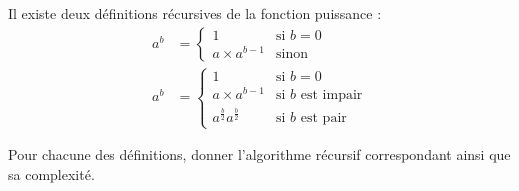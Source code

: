 \documentclass{../cours}
\begin{document}
\begin{exercice}
Il existe deux définitions récursives de la fonction puissance :
\begin{align*}
a^b &= \begin{cases}
1 &\text{si }b=0 \\
a \times a^{b-1} &\text{sinon}
\end{cases} \\
a^b &= \begin{cases}
1 &\text{si }b=0 \\
a \times a^{b-1} &\text{si }b\text{ est impair} \\
a^{\frac{b}{2}}a^{\frac{b}{2}} &\text{si }b\text{ est pair}
\end{cases}
\end{align*}

Pour chacune des définitions, donner l'algorithme récursif correspondant ainsi que sa complexité.

\end{exercice}
\end{document}
